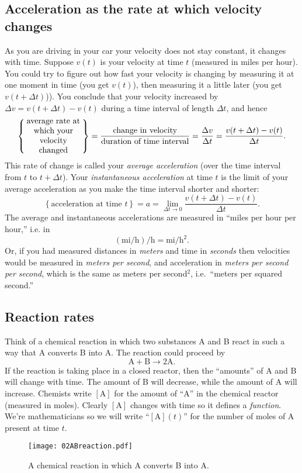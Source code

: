\subsection{Acceleration as the rate at which velocity changes}
As you are driving in your car your velocity does not stay constant, it changes with time.
 Suppose $v(t)$ is your velocity at time $t$ (measured in miles per hour).  You could try
to figure out how fast your velocity is changing by measuring it at one moment in time
(you get $v(t)$), then measuring it a little later (you get $v(t+\Delta t)$)).  You
conclude that your velocity increased by $\Delta v = v(t+ \Delta t) - v(t)$ during a time
interval of length $\Delta t$, and hence
\begin{multline*}
  \left\{\parbox{7em}{\centering average rate at which your velocity
  changed} \right\}
  = \frac{\text{change in velocity}}{\text{duration of time
  interval}}
  =\frac{\Delta v}{\Delta t} =\frac{v(t+ \Delta t) -
  v(t)}{\Delta t}.
\end{multline*}
This rate of change is called your \textit{average acceleration} (over the time interval
from $t$ to $t+\Delta t$).  Your \textit{instantaneous acceleration} at time $t$ is the
limit of your average acceleration as you make the time interval shorter and shorter:
\[
\left\{ \text{acceleration at time $t$} \right\} = a = \lim_{\Delta t\to 0}
\frac{v(t+ \Delta t) - v(t)}{\Delta t}.
\]
The average and instantaneous accelerations are measured in ``miles per hour per hour,''
i.e. in
\[
(\textrm{mi}/\textrm{h})/\textrm{h} = \textrm{mi}/\textrm{h}^2.
\]
Or, if you had measured distances in \textit{meters} and time in \textit{seconds} then
velocities would be measured in \textit{meters per second}, and acceleration in
\textit{meters per second per second}, which is the same as meters per second$^2$, i.e.\
``meters per squared second.''

\subsection{Reaction rates}
Think of a chemical reaction in which two substances A and B react in such a way that A
converts B into A.  The reaction could proceed by
\[
\textrm{A} +  \textrm{B} \longrightarrow 2\textrm{A}.
\]
If the reaction is taking place in a closed reactor, then the ``amounts'' of A and B will
change with time.  The amount of B will decrease, while the amount of A will increase.
Chemists write $[\textrm{A}]$ for the amount of ``A'' in the chemical reactor (measured in
moles).  Clearly $[\textrm{A}]$ changes with time so it defines a \textit{function}. 
We're mathematicians so we will write ``$[\textrm{A}](t)$'' for the number of moles of A
present at time $t$.
\begin{figure}[h]
  \begin{center}
    \texttt{[image: 02ABreaction.pdf]}
  \end{center}
  \caption{A chemical reaction in which A converts B into A.}
  \label{fig:02ABreaction}
\end{figure}

